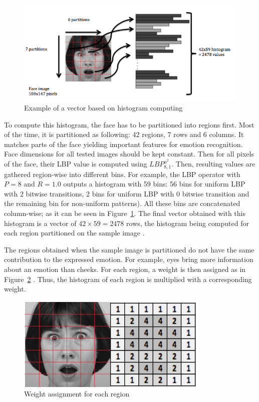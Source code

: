 \begin{figure}[!h]
\begin{center}
\noindent \includegraphics[scale=0.7]{figures/lbp_histogram} 
\newline
\caption{Example of a vector based on histogram computing}
\label{lbp_histogram}
\end{center} 
\end{figure}

\noindent To compute this histogram, the face has to be partitioned into regions first. Most of the time, it is partitioned as following: 42 regions, 7 rows and 6 columns. It matches parts of the face yielding important features for emotion recognition. Face dimensions for all tested images should be kept constant. Then for all pixels of the face, their LBP value is computed using $ LBP_{8,1}^{u^2} $. Then, resulting values are gathered region-wise into different bins. For example, the LBP operator with $ P = 8 $ and $ R = 1.0 $ outputs a histogram with 59 bins: 56 bins for uniform LBP with 2 bitwise transitions, 2 bins for  uniform LBP with 0 bitwise transition and the remaining bin for non-uniform patterns). All these bins are concatenated column-wise; as it can be seen in Figure~\ref{lbp_histogram}. The final vector obtained with this histogram is a vector of $ 42\times59 = 2478 $ rows, the histogram being computed for each region partitioned on the sample image \cite{GAN08}.
\newline

\noindent The regions obtained when the sample image is partitioned do not have the same contribution to the expressed emotion. For example, eyes bring more information about an emotion than cheeks. For each region, a weight is then assigned as in Figure~\ref{lbp_region_weight} \cite{GAN08}. Thus, the histogram of each region is multiplied with a corresponding weight.
\newline

\begin{figure}[!h]
\begin{center}
\noindent \includegraphics[scale=0.6]{figures/lbp_region_weight} 
\newline
\caption{Weight assignment for each region}
\label{lbp_region_weight}
\end{center} 
\end{figure}
